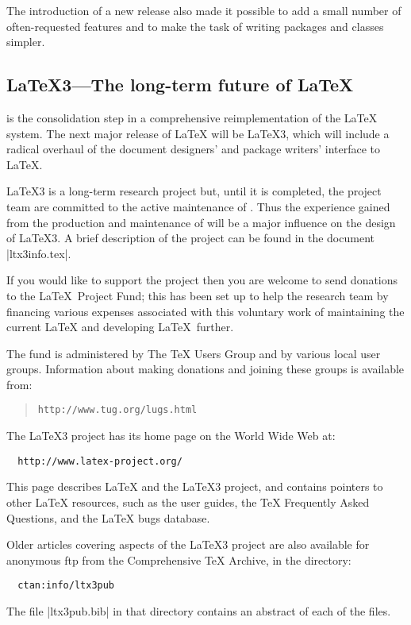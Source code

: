 \documentclass{ltxguide}[2001/05/28]
\begin{document}
The introduction of a new release also made it possible to add a small
number of often-requested features and to make the task of writing
packages and classes simpler.

\subsection{\LaTeX3---The long-term future of \LaTeX}
\label{Sec:ltx3}

\LaTeXe{} is the consolidation step in a comprehensive
reimplementation of the \LaTeX{} system.  The next major release of
\LaTeX{} will be \LaTeX3, which will include a radical overhaul of the
document designers' and package writers' interface to \LaTeX.

\LaTeX3 is a long-term research project but, until it is completed,
the project team are committed to the active maintenance of \LaTeXe{}.
Thus the experience gained from the production and maintenance of
\LaTeXe{} will be a major influence on the design of \LaTeX3.
A brief description of the project can be found in the document
|ltx3info.tex|.

If you would like to support the project then you are welcome to send
donations to the \LaTeX\ Project Fund; this has been set up to help
the research team by financing various expenses associated with this
voluntary work of maintaining the current \LaTeX{} and developing
\LaTeX\ further.

The fund is administered by The \TeX{} Users Group and by various
local user groups.  Information about making donations and joining
these groups is available from:
\begin{quote}\small\label{addrs}
   \texttt{http://www.tug.org/lugs.html}
\end{quote}

The \LaTeX3{} project has its home page
on the World Wide Web at:
\begin{verbatim}
  http://www.latex-project.org/
\end{verbatim}
This page describes \LaTeX{} and the \LaTeX3 project, and contains
pointers to other \LaTeX{} resources, such as the user guides, the
\TeX{} Frequently Asked Questions, and the \LaTeX{} bugs database.

Older articles covering aspects of the \LaTeX3 project are also
available for anonymous ftp from the Comprehensive \TeX{} Archive, in
the directory:
\begin{verbatim}
  ctan:info/ltx3pub
\end{verbatim}
The file |ltx3pub.bib| in that directory contains an abstract of each
of the files.
\end{document}
